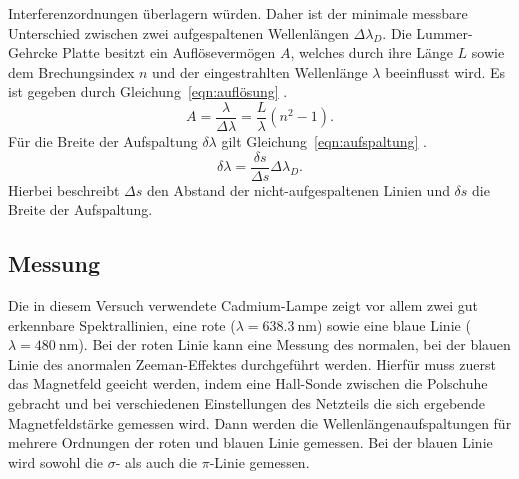 Interferenzordnungen überlagern würden. Daher ist der minimale messbare
Unterschied zwischen zwei aufgespaltenen Wellenlängen $\Delta \lambda_{D}$.
Die Lummer-Gehrcke Platte besitzt ein Auflösevermögen $A$, welches durch
ihre Länge $L$ sowie dem Brechungsindex $n$ und der eingestrahlten Wellenlänge
$\lambda$ beeinflusst wird. Es ist gegeben durch Gleichung~\ref{eqn:auflösung} \cite{Versuchsbeschreibung}.
\begin{equation}
 A = \frac{\lambda}{\Delta\lambda} = \frac{L}{\lambda}(n^{2}-1).
 \label{eqn:auflösung}
\end{equation}
Für die Breite der Aufspaltung $\delta\lambda$ gilt Gleichung~\ref{eqn:aufspaltung} \cite{Versuchsbeschreibung}.
\begin{equation}
 \delta \lambda = \frac{\delta s}{\Delta s} \Delta \lambda_{D}.
 \label{eqn:aufspaltung}
\end{equation}
Hierbei beschreibt $\Delta s$ den Abstand der nicht-aufgespaltenen Linien und $\delta s$
die Breite der Aufspaltung.

\subsection{Messung}
\label{Messung}
Die in diesem Versuch verwendete Cadmium-Lampe zeigt vor allem zwei gut erkennbare
Spektrallinien, eine rote ($\lambda = \SI{638.3}{\nano\meter}$) sowie eine
blaue Linie ($\lambda = \SI{480}{\nano\meter}$). Bei der roten Linie kann eine
Messung des normalen, bei der blauen Linie des anormalen Zeeman-Effektes durchgeführt
werden. Hierfür muss zuerst das Magnetfeld geeicht werden, indem eine Hall-Sonde zwischen
die Polschuhe gebracht und bei verschiedenen Einstellungen des Netzteils die sich
ergebende Magnetfeldstärke gemessen wird. Dann werden die Wellenlängenaufspaltungen
für mehrere Ordnungen der roten und blauen Linie gemessen. Bei der blauen Linie wird
sowohl die $\sigma$- als auch die $\pi$-Linie gemessen.
